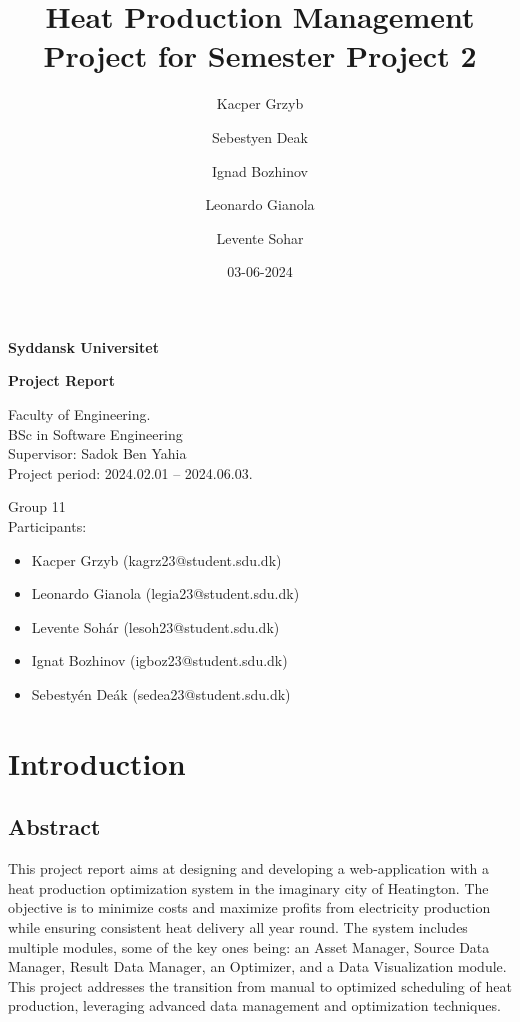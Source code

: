 \documentclass[12pt]{report}
\title{Heat Production Management Project for Semester Project 2}
\author{Kacper Grzyb \and Sebestyen Deak \and Ignad Bozhinov \and Leonardo Gianola \and Levente Sohar}
\date{03-06-2024}
\begin{document}
\begin{titlepage}
  \centering
  \vspace*{1cm}
  
  \Huge
  \textbf{Syddansk Universitet}
  
  \vspace{2cm}
  
  \Huge
  \textbf{Project Report}
  
  \vfill
  
  \large
  Faculty of Engineering.\\
  BSc in Software Engineering\\
  Supervisor: Sadok Ben Yahia\\
  Project period: 2024.02.01 -- 2024.06.03.
  
  \vfill
  \begin{flushleft}  
    Group 11\\
    Participants:
  \end{flushleft}

  \begin{flushright}
    \begin{itemize}
      \item Kacper Grzyb (kagrz23@student.sdu.dk)
      \item Leonardo Gianola (legia23@student.sdu.dk)
      \item Levente Sohár (lesoh23@student.sdu.dk)
      \item Ignat Bozhinov (igboz23@student.sdu.dk)
      \item Sebestyén Deák (sedea23@student.sdu.dk)
    \end{itemize}
  \end{flushright}

\end{titlepage}

\tableofcontents

\chapter{Introduction}

\section*{Abstract}
This project report aims at designing and developing a web-application with a heat production optimization system in the imaginary city of Heatington. The objective is to minimize costs and maximize profits from electricity production while ensuring consistent heat delivery all year round. The system includes multiple modules, some of the key ones being: an Asset Manager, Source Data Manager, Result Data Manager, an Optimizer, and a Data Visualization module. This project addresses the transition from manual to optimized scheduling of heat production, leveraging advanced data management and optimization techniques.
\end{document}
